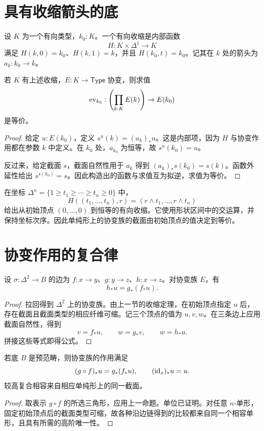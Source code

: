 \section{具有收缩箭头的底}
\begin{definition}[有向收缩]
设 $K$ 为一个有向类型，$k_0:K$。一个有向收缩是内部函数
\[
H:K\times\Delta^1\to K
\]
满足 $H(k,0)=k_0$、$H(k,1)=k$，并且 $H(k_0,t)=k_0$。记其在 $k$ 处的箭头为 $a_k:k_0\to k$。
\end{definition}
\begin{theorem}[收缩底上的截面]\label{thm:directed-contraction}
若 $K$ 有上述收缩，$E:K\to\mathsf{Type}$ 协变，则求值
\[
\operatorname{ev}_{k_0}:\left(\prod_{k:K}E(k)\right)\to E(k_0)
\]
是等价。
\end{theorem}
\begin{proof}
给定 $u:E(k_0)$，定义 $s^u(k)=(a_k)_*u$。这是内部项，因为 $H$ 与协变作用都在参数 $k$ 中定义。在 $k_0$ 处，$a_{k_0}$ 为恒等，故 $s^u(k_0)=u$。

反过来，给定截面 $s$，截面自然性用于 $a_k$ 得到
$(a_k)_*s(k_0)=s(k)$。函数外延性给出 $s^{s(k_0)}=s$。因此构造出的函数与求值互为拟逆，求值为等价。
\end{proof}
\begin{example}[单纯形的初始顶点]
在坐标 $\Delta^n=\{1\ge t_1\ge\cdots\ge t_n\ge0\}$ 中，
\[
H((t_1,\ldots,t_n),r)
=(r\wedge t_1,\ldots,r\wedge t_n)
\]
给出从初始顶点 $(0,\ldots,0)$ 到恒等的有向收缩。它使用形状区间中的交运算，并保持坐标次序。因此单纯形上的协变族的截面由初始顶点的值决定到等价。
\end{example}

\section{协变作用的复合律}
\begin{proposition}[三角形中的复合传输]
设 $\sigma:\Delta^2\to B$ 的边为 $f:x\to y$、$g:y\to z$、$h:x\to z$。对协变族 $E$，有
\[
h_*u=g_*(f_*u).
\]
\end{proposition}
\begin{proof}
拉回得到 $\Delta^2$ 上的协变族。由上一节的收缩定理，在初始顶点指定 $u$ 后，存在截面且截面类型的相应纤维可缩。记三个顶点的值为 $u,v,w$。在三条边上应用截面自然性，得到
\[
v=f_*u,\qquad w=g_*v,\qquad w=h_*u.
\]
拼接这些等式即得公式。
\end{proof}
\begin{proposition}[函子性]
若底 $B$ 是预范畴，则协变族的作用满足
\[
(g\circ f)_*u=g_*(f_*u),
\qquad(\operatorname{id}_x)_*u=u.
\]
较高复合相容来自相应单纯形上的同一截面。
\end{proposition}
\begin{proof}
取表示 $g\circ f$ 的所选三角形，应用上一命题。单位已证明。对任意 $n$-单形，固定初始顶点后的截面类型可缩，故各种沿边链得到的比较都来自同一个相容单形，且具有所需的高阶唯一性。
\end{proof}

